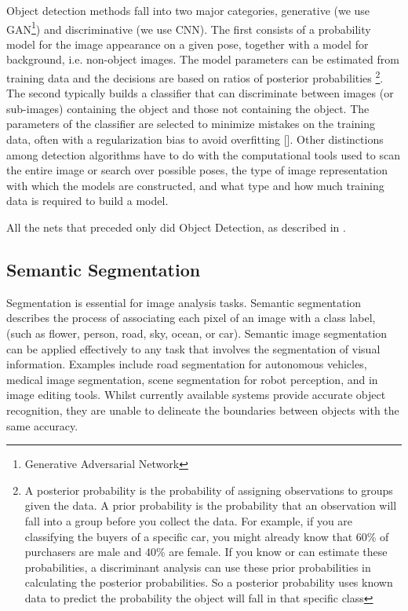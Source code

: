 Object detection methods fall into two major categories, generative (we use GAN\footnote{Generative Adversarial Network}) and discriminative (we use CNN). The first consists of a probability model for the image appearance on a given pose, together with a model for background, i.e. non-object images. The model parameters can be estimated from training data and the decisions are based on ratios of posterior probabilities \footnote{A posterior probability is the probability of assigning observations to groups given the data. A prior probability is the probability that an observation will fall into a group before you collect the data. For example, if you are classifying the buyers of a specific car, you might already know that 60\% of purchasers are male and 40\% are female. If you know or can estimate these probabilities, a discriminant analysis can use these prior probabilities in calculating the posterior probabilities. So a posterior probability uses known data to predict the probability the object will fall in that specific class}.
The second typically builds a classifier that can discriminate between images (or sub-images) containing the object and those not containing the object. The parameters of the classifier are selected to minimize mistakes on the training data, often with a regularization bias to avoid overfitting []. Other distinctions among detection algorithms have to do with the computational tools used to scan the entire image or search over possible poses, the type of image representation with which the models are constructed, and what type and how much training data is required to build a model.	

All the nets that preceded \maskrcnn only did Object Detection, as described in .




\subsection{Semantic Segmentation}\label{s:patt-sema}
Segmentation is essential for image analysis tasks. Semantic segmentation describes the process of associating each pixel of an image with a class label, (such as flower, person, road, sky, ocean, or car).
Semantic image segmentation can be applied effectively to any task that involves the segmentation of visual information. Examples include road segmentation for autonomous vehicles, medical image segmentation, scene segmentation for robot perception, and in image editing tools. Whilst currently available systems provide accurate object recognition, they are unable to delineate the boundaries between objects with the same accuracy.

